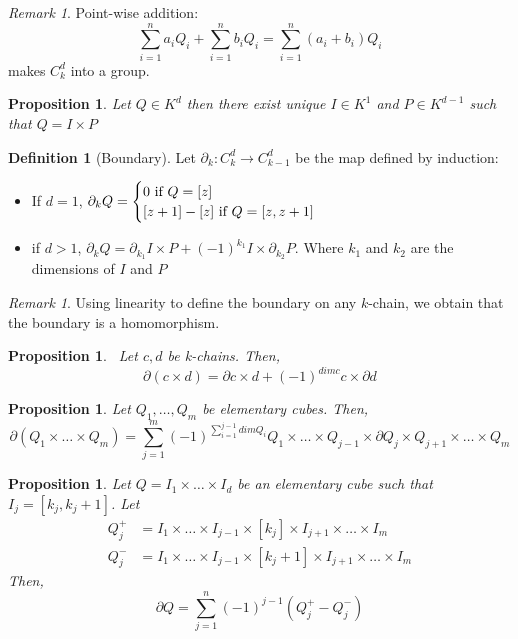 \documentclass{article}
\theoremstyle{plain}
\newtheorem{prop}[thm]{Proposition}
\theoremstyle{definition}
\newtheorem{definition}[thm]{Definition}
\theoremstyle{remark}
\newtheorem{remark}[thm]{Remark}
\begin{document}
\begin{remark}
Point-wise addition: \[ \sum_{i=1}^n a_i Q_i + \sum_{i=1}^n b_i Q_i = \sum_{i=1}^n (a_i+b_i) Q_i \] makes $C_k^d$ into a group.
\end{remark}

\begin{prop}
Let $Q \in K^d$ then there exist unique $I \in K^1$ and $P \in K^{d-1}$ such that $Q= I \times P$
\end{prop}

\begin{definition}[Boundary]
Let $\partial_k : C_k^d \to C_{k-1}^d$ be the map defined by induction: 
\begin{itemize}
    \item If $d=1$, $\partial_k Q =
    \begin{cases}
    0 \ \textmd{if} \ Q=[z] \\
    [z+1] - [z] \ \textmd{if} \ Q=[z,z+1]
    \end{cases}$
    \item if $d>1$, $\partial_k Q = \partial_{k_1} I \times P + (-1)^{k_1} I \times \partial_{k_2}P $. Where $k_1$ and $k_2$ are the dimensions of $I$ and $P$  
\end{itemize}
\end{definition}

\begin{remark}
Using linearity to define the boundary on any $k$-chain, we obtain that the boundary is a homomorphism.
\end{remark}

\begin{prop}\ Let $c,d$ be k-chains. Then, \[ \partial(c \times d) = \partial c \times d + (-1)^{dim c} c \times \partial d \]
\end{prop}

\begin{prop}
Let $Q_1, \dots , Q_m$ be elementary cubes. Then, 
\[ \partial(Q_1 \times \dots \times Q_m) = \sum_{j=1}^m (-1)^{\sum_{i=1}^{j-1} dim Q_i} Q_1 \times \dots \times Q_{j-1} \times \partial Q_j \times Q_{j+1} \times \dots \times Q_m \]
\end{prop}

\begin{prop}
Let $Q= I_1 \times \dots \times I_d$ be an elementary cube such that $I_j = [k_j, k_j+1]$. Let 
\begin{align*}
Q^+_j &= I_1 \times \dots \times I_{j-1} \times [k_j] \times I_{j+1} \times \dots \times I_m \\
Q^-_j &= I_1 \times \dots \times I_{j-1} \times [k_j+1] \times I_{j+1} \times \dots \times I_m 
\end{align*}
Then, \[ \partial Q = \sum_{j=1}^n (-1)^{j-1} (Q^+_j - Q^-_j) \]
\end{prop}
\end{document}
